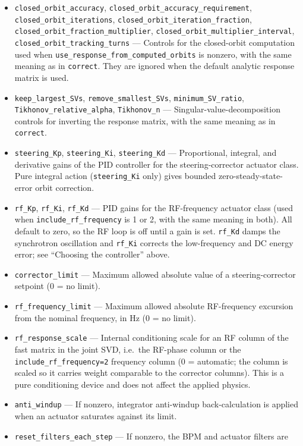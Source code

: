 \documentclass[11pt]{article}
\begin{document}
\begin{itemize}
\item \verb|closed_orbit_accuracy|, \verb|closed_orbit_accuracy_requirement|,
  \verb|closed_orbit_iterations|, \verb|closed_orbit_iteration_fraction|,
  \verb|closed_orbit_fraction_multiplier|, \verb|closed_orbit_multiplier_interval|,
  \verb|closed_orbit_tracking_turns| --- Controls for the closed-orbit computation used when
  \verb|use_response_from_computed_orbits| is nonzero, with the same meaning as in
  \verb|correct|.  They are ignored when the default analytic response matrix is used.
\item \verb|keep_largest_SVs|, \verb|remove_smallest_SVs|, \verb|minimum_SV_ratio|,
  \verb|Tikhonov_relative_alpha|, \verb|Tikhonov_n| --- Singular-value-decomposition
  controls for inverting the response matrix, with the same meaning as in \verb|correct|.
\item \verb|steering_Kp|, \verb|steering_Ki|, \verb|steering_Kd| --- Proportional,
  integral, and derivative gains of the PID controller for the steering-corrector
  actuator class.  Pure integral action (\verb|steering_Ki| only) gives bounded
  zero-steady-state-error orbit correction.
\item \verb|rf_Kp|, \verb|rf_Ki|, \verb|rf_Kd| --- PID gains for the RF-frequency actuator
  class (used when \verb|include_rf_frequency| is 1 or 2, with the same meaning in both).  All
  default to zero, so the RF loop is off until a gain is set.  \verb|rf_Kd| damps the
  synchrotron oscillation and \verb|rf_Ki| corrects the low-frequency and DC energy error; see
  ``Choosing the controller'' above.
\item \verb|corrector_limit| --- Maximum allowed absolute value of a steering-corrector
  setpoint (0 = no limit).
\item \verb|rf_frequency_limit| --- Maximum allowed absolute RF-frequency excursion from
  the nominal frequency, in Hz (0 = no limit).
\item \verb|rf_response_scale| --- Internal conditioning scale for an RF column of the fast
  matrix in the joint SVD, i.e.\ the RF-phase column or the \verb|include_rf_frequency=2|
  frequency column (0 = automatic; the column is scaled so it carries weight comparable to the
  corrector columns).  This is a pure conditioning device and does not affect the applied
  physics.
\item \verb|anti_windup| --- If nonzero, integrator anti-windup back-calculation is
  applied when an actuator saturates against its limit.
\item \verb|reset_filters_each_step| --- If nonzero, the BPM and actuator filters are

\end{itemize}
\end{document}
